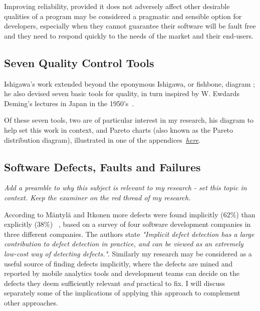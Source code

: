 Improving reliability, provided it does not adversely affect other desirable qualities of a program may be considered a pragmatic and sensible option for developers, especially when they cannot guarantee their software will be fault free and they need to respond quickly to the needs of the market and their end-users.



\subsection{Seven Quality Control Tools}
Ishigawa's work extended beyond the eponymous Ishigawa, or fishbone, diagram %
; he also devised seven basic tools for quality, in turn inspired by W. Ewdards Deming's lectures in Japan in the 1950's~\cite{7_basic_quality_tools_with_R}.

Of these seven tools, two are of particular interest in my research, his diagram to help set this work in context, and Pareto charts (also known as the Pareto distribution diagram), illustrated in one of the appendices~\hyperlink{pareto.diagrams.in.r}{\emph{here}}.


\hypertarget{defects.faults.failures}{}
\subsection{Software Defects, Faults and Failures}
\emph{Add a preamble to why this subject is relevant to my research - set this topic in context. Keep the examiner on the red thread of my research.}


According to Mäntylä and Itkonen more defects were found implicitly (62\%) than explicitly (38\%) ~\cite{mantyla2014_how_are_software_defects_found}, based on a survey of four software development companies in three different companies. The authors state \emph{"Implicit defect detection has a large contribution to defect detection in practice, and can be viewed as
an extremely low-cost way of detecting defects."}. Similarly my research may be considered as a useful source of finding defects implicitly, where the defects are mined and reported by mobile analytics tools and development teams can decide on the defects they deem sufficiently relevant \emph{and} practical to fix. I will discuss separately some of the implications of applying this approach to complement other approaches.

